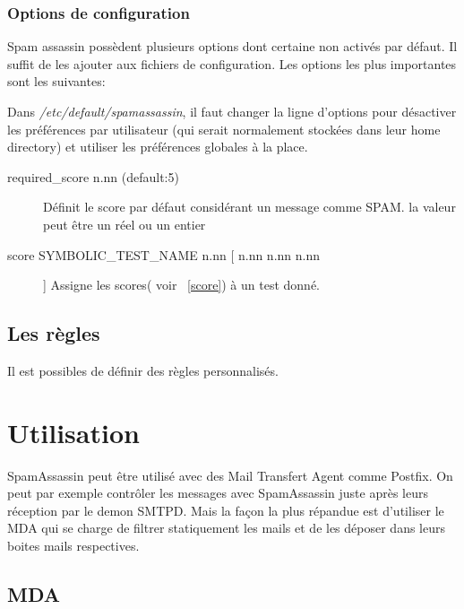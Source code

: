\documentclass[a4paper,11pt]{article}
\begin{document}
\subsubsection{Options de configuration}

Spam assassin possèdent plusieurs options dont certaine non activés par défaut. Il suffit de les ajouter aux fichiers 
de configuration.
Les options les plus importantes sont les suivantes:

\begin{description}
 \item [Désactiver les préférences utilisateurs]Dans \emph{/etc/default/spamassassin}, il faut changer la ligne d'options pour désactiver les préférences par utilisateur (qui serait normalement stockées dans leur home directory) et utiliser les préférences globales à la place. 
 \item [Options de score] \begin{description}
                           \item [required\_score n.nn (default:5)] Définit le score par défaut considérant un message comme SPAM. la valeur peut être un réel ou un entier
                           \item [score SYMBOLIC\_TEST\_NAME n.nn [ n.nn n.nn n.nn ]] Assigne les scores( voir ~\ref{score}) à un test donné.
                          \end{description}
\item 

\end{description}
\label{baye_conf}


\subsection{Les règles}

Il est possibles de définir des règles personnalisés. 

\section{ Utilisation }


SpamAssassin peut être utilisé avec des Mail Transfert Agent comme Postfix. On peut par exemple contrôler les messages
avec SpamAssassin juste après leurs réception par le demon SMTPD. Mais la façon la plus répandue est d'utiliser le MDA qui se charge
de filtrer statiquement les mails et de les déposer dans leurs boites mails respectives. 

\subsection{MDA}
\end{document}
